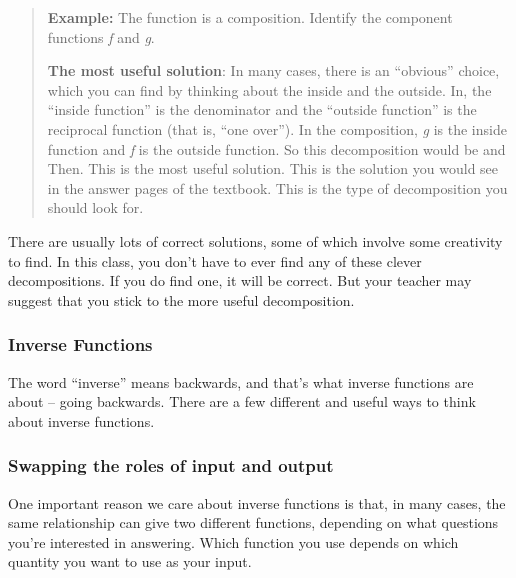 \begin{quote}
\textbf{Example:} The function is a composition. Identify the component
functions \emph{f} and \emph{g}.

\textbf{The most useful solution}: In many cases, there is an
``obvious'' choice, which you can find by thinking about the inside and
the outside. In, the ``inside function'' is the denominator and the
``outside function'' is the reciprocal function (that is, ``one over'').
In the composition, \emph{g} is the inside function and \emph{f} is the
outside function. So this decomposition would be and Then. This is the
most useful solution. This is the solution you would see in the answer
pages of the textbook. This is the type of decomposition you should look
for.
\end{quote}

There are usually lots of correct solutions, some of which involve some
creativity to find. In this class, you don't have to ever find any of
these clever decompositions. If you do find one, it will be correct. But
your teacher may suggest that you stick to the more useful
decomposition.

\subsubsection{Inverse Functions}\label{inverse-functions}

The word ``inverse'' means backwards, and that's what inverse functions
are about -- going backwards. There are a few different and useful ways
to think about inverse functions.

\subsubsection{Swapping the roles of input and
output}\label{swapping-the-roles-of-input-and-output}

One important reason we care about inverse functions is that, in many
cases, the same relationship can give two different functions, depending
on what questions you're interested in answering. Which function you use
depends on which quantity you want to use as your input.

